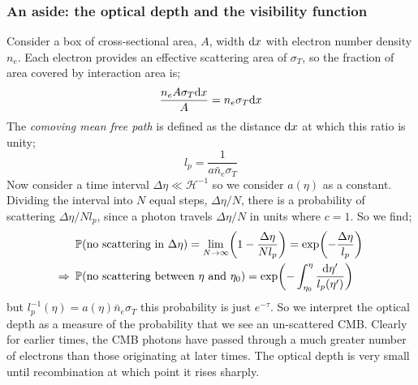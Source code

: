 \subsubsection*{An aside: the optical depth and the visibility function}
Consider a box of cross-sectional area, $A$, width $\text{d} x$ with electron number density $n_e$. Each electron provides an effective scattering area of $\sigma_T$, so the fraction of area covered by interaction area is;
\begin{equation*}
\frac{n_e A \sigma_T \text{d} x }{A} = n_e \sigma_T \text{d} x
\end{equation*}
The \emph{comoving mean free path} is defined as the distance $\text{d} x$ at which this ratio is unity;
\begin{equation}
l_p = \frac{1}{a\bar{n}_e\sigma_T}
\end{equation}
Now consider a time interval $\Delta \eta \ll \mathcal{H}^{-1}$ so we consider $a(\eta)$ as a constant. Dividing the interval into $N$ equal steps, $\Delta \eta/N$, there is a probability of scattering $\Delta \eta / N l_p$, since a photon travels $\Delta \eta/N$ in units where $c = 1$. So we find;
\begin{align*}
&\mathbb{P}(\text{no scattering in}\,\, \Delta \eta) = \lim_{N \rightarrow \infty}\left(1 - \frac{\Delta \eta}{Nl_p}\right) = \exp\left(-\frac{\Delta \eta}{l_p}\right) \\
\Rightarrow \,\,\,&\mathbb{P}(\text{no scattering between}\,\,\eta\,\,\text{and}\,\,\eta_0) = \exp\left(-\int_{\eta_0}^{\eta}{\frac{\ud \eta\pr}{l_p(\eta\pr)}}\right)
\end{align*}
but $l_p^{-1}(\eta) = a(\eta)\bar{n}_e\sigma_T$ this probability is just $e^{-\tau}$. So we interpret the optical depth as a measure of the probability that we see an un-scattered CMB. Clearly for earlier times, the CMB photons have passed through a much greater number of electrons than those originating at later times. The optical depth is very small until recombination at which point it rises sharply.

